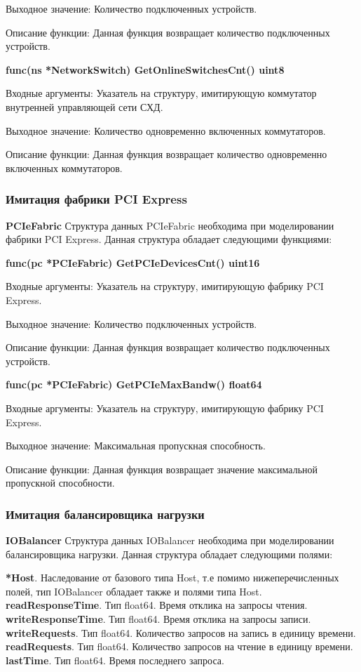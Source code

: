 Выходное значение: Количество подключенных устройств.

Описание функции: Данная функция возвращает количество подключенных устройств.

\textbf{func(ns *NetworkSwitch) GetOnlineSwitchesCnt() uint8}

Входные аргументы: Указатель на структуру, имитирующую коммутатор внутренней управляющей сети СХД.

Выходное значение: Количество одновременно включенных коммутаторов.

Описание функции: Данная функция возвращает количество одновременно включенных коммутаторов.

\subsubsection{Имитация фабрики PCI Express}
\textbf{PCIeFabric}
Структура данных PCIeFabric необходима при моделировании фабрики PCI Express. Данная структура обладает следующими функциями:

\textbf{func(pc *PCIeFabric) GetPCIeDevicesCnt() uint16}

Входные аргументы: Указатель на структуру, имитирующую фабрику PCI Express.

Выходное значение: Количество подключенных устройств.

Описание функции: Данная функция возвращает количество подключенных устройств.


\textbf{func(pc *PCIeFabric) GetPCIeMaxBandw() float64}

Входные аргументы: Указатель на структуру, имитирующую фабрику PCI Express.

Выходное значение: Максимальная пропускная способность.

Описание функции: Данная функция возвращает значение максимальной пропускной способности.

\subsubsection{Имитация балансировщика нагрузки}
\textbf{IOBalancer}
Структура данных IOBalancer необходима при моделировании балансировщика нагрузки. Данная структура обладает следующими полями:

\textbf{	*Host}. Наследование от базового типа Host, т.е помимо нижеперечисленных полей, тип IOBalancer обладает также и полями типа Host. 
\textbf{	readResponseTime}. Тип float64. Время отклика на запросы чтения.
\textbf{	writeResponseTime}. Тип float64. Время отклика на запросы записи.
\textbf{	writeRequests}. Тип float64. Количество запросов на запись в единицу времени.
\textbf{	readRequests}. Тип  float64. Количество запросов на чтение в единицу времени.
\textbf{	lastTime}. Тип float64. Время последнего запроса. 


